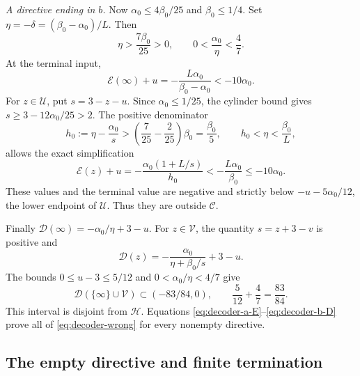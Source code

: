 \smallskip\noindent\emph{A directive ending in $b$.}
Now $\alpha_0\leqslant4\beta_0/25$ and $\beta_0\leqslant1/4$. Set
$\eta=-\delta=(\beta_0-\alpha_0)/L$. Then
$$
 \eta>\frac{7\beta_0}{25}>0,\qquad
 0<\frac{\alpha_0}{\eta}<\frac47.
$$
At the terminal input,
$$
 \mathcal E(\infty)+u=-\frac{L\alpha_0}{\beta_0-\alpha_0}
 <-10\alpha_0.
$$
For $z\in\mathcal U$, put $s=3-z-u$.
Since $\alpha_0\leqslant1/25$, the cylinder bound gives
$s\geqslant3-12\alpha_0/25>2$.
The positive denominator
$$
 h_0:=\eta-\frac{\alpha_0}{s}
 >\left(\frac7{25}-\frac2{25}\right)\beta_0
 =\frac{\beta_0}{5},\qquad h_0<\eta<\frac{\beta_0}{L},
$$
allows the exact simplification
\begin{equation}\label{eq:decoder-b-E}
 \mathcal E(z)+u
 =-\frac{\alpha_0(1+L/s)}{h_0}
 <-\frac{L\alpha_0}{\beta_0}\leqslant-10\alpha_0.
\end{equation}
These values and the terminal value are negative and strictly below
$-u-5\alpha_0/12$, the lower endpoint of $\mathcal U$.
Thus they are outside $\mathcal C$.

Finally $\mathcal D(\infty)=-\alpha_0/\eta+3-u$.
For $z\in\mathcal V$, the quantity $s=z+3-v$ is positive and
$$
 \mathcal D(z)=-\frac{\alpha_0}{\eta+\beta_0/s}+3-u.
$$
The bounds $0\leqslant u-3\leqslant5/12$ and
$0<\alpha_0/\eta<4/7$ give
\begin{equation}\label{eq:decoder-b-D}
 \mathcal D(\{\infty\}\cup\mathcal V)
 \subset(-83/84,0),\qquad \frac5{12}+\frac47=\frac{83}{84}.
\end{equation}
This interval is disjoint from $\mathcal H$. Equations
\eqref{eq:decoder-a-E}--\eqref{eq:decoder-b-D} prove all of
\eqref{eq:decoder-wrong} for every nonempty directive.

\subsection{The empty directive and finite termination}

